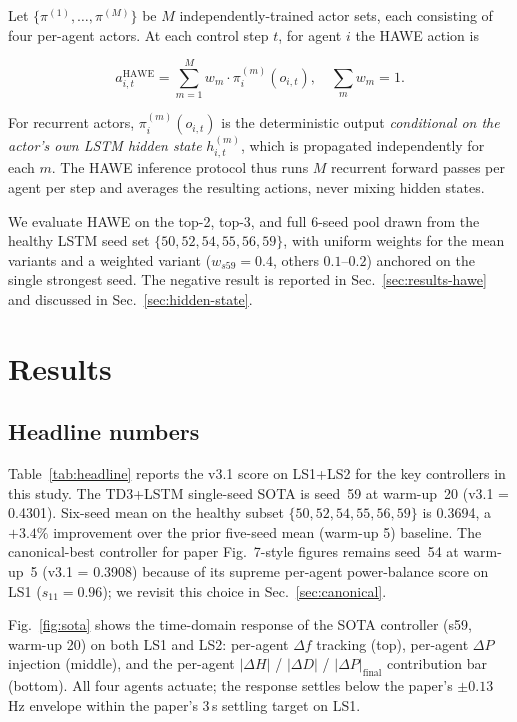 \documentclass[journal,onecolumn,11pt]{IEEEtran}
\begin{document}
Let $\{\pi^{(1)}, \ldots, \pi^{(M)}\}$ be $M$ independently-trained
actor sets, each consisting of four per-agent actors. At each
control step $t$, for agent $i$ the HAWE action is

\begin{equation}\label{eq:hawe}
  a_{i,t}^{\text{HAWE}}
    = \sum_{m=1}^{M} w_m \cdot \pi^{(m)}_i(o_{i,t}),
  \quad \sum_m w_m = 1.
\end{equation}

For recurrent actors, $\pi^{(m)}_i(o_{i,t})$ is the deterministic
output \emph{conditional on the actor's own LSTM hidden state}
$h^{(m)}_{i,t}$, which is propagated independently for each $m$.
The HAWE inference protocol thus runs $M$ recurrent forward passes
per agent per step and averages the resulting actions, never
mixing hidden states.

We evaluate HAWE on the top-2, top-3, and full 6-seed pool drawn
from the healthy LSTM seed set $\{50, 52, 54, 55, 56, 59\}$, with
uniform weights for the mean variants and a weighted variant
($w_{s59} = 0.4$, others $0.1$--$0.2$) anchored on the single
strongest seed. The negative result is reported in
Sec.~\ref{sec:results-hawe} and discussed in
Sec.~\ref{sec:hidden-state}.

\section{Results}\label{sec:results}

\subsection{Headline numbers}\label{sec:results-headline}

Table~\ref{tab:headline} reports the v3.1 score on LS1+LS2 for the
key controllers in this study. The TD3+LSTM single-seed SOTA is
seed~59 at warm-up~20 (v3.1 = 0.4301). Six-seed mean on the healthy
subset $\{50, 52, 54, 55, 56, 59\}$ is 0.3694, a $+3.4\%$
improvement over the prior five-seed mean (warm-up 5) baseline. The
canonical-best controller for paper Fig.~7-style figures remains
seed~54 at warm-up~5 (v3.1 = 0.3908) because of its supreme
per-agent power-balance score on LS1 ($s_{11} = 0.96$); we revisit
this choice in Sec.~\ref{sec:canonical}.

Fig.~\ref{fig:sota} shows the time-domain response of the SOTA
controller (s59, warm-up 20) on both LS1 and LS2: per-agent
$\Delta f$ tracking (top), per-agent $\Delta P$ injection (middle),
and the per-agent $|\Delta H|$ / $|\Delta D|$ / $|\Delta P|_{\text{final}}$
contribution bar (bottom). All four agents actuate; the response
settles below the paper's $\pm 0.13$\,Hz envelope within the paper's
3\,s settling target on LS1.
\end{document}
